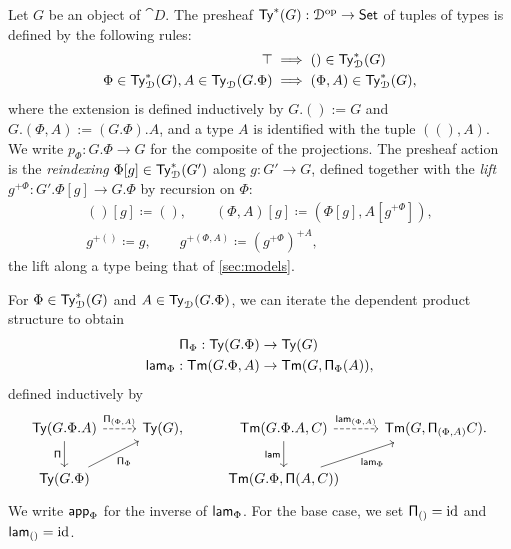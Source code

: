 \begin{definition}\label{def:type-telescopes}
    Let $G$ be an object of $\cat{D}$. The presheaf $\mathsf{Ty}^*(G) : \mathcal{D}^{\mathrm{op}}\to\mathsf{Set}$ of tuples of types is defined by the following rules:
    \begin{align*}
        \top &\implies () \in \mathsf{Ty}^*_{\mathcal{D}}(G)\\
        \Phi \in \mathsf{Ty}^*_{\mathcal{D}}(G), A \in \mathsf{Ty}_{\mathcal{D}}(G.\Phi) &\implies (\Phi,A) \in \mathsf{Ty}^*_{\mathcal{D}}(G),
    \end{align*}
    where the extension is defined inductively by $G.() := G$ and $G.(\Phi,A) := (G.\Phi).A$, and a type $A$ is identified with the tuple $((),A)$. We write $p_\Phi : G.\Phi \to G$ for the composite of the projections. The presheaf action is the \emph{reindexing} $\Phi[g] \in \mathsf{Ty}^*_{\mathcal{D}}(G')$ along $g : G' \to G$, defined together with the \emph{lift} $g^{+\Phi} : G'.\Phi[g] \to G.\Phi$ by recursion on $\Phi$:
    \begin{gather*}
        ()[g] \coloneqq (), \qquad (\Phi, A)[g] \coloneqq (\Phi[g], A[g^{+\Phi}]),\\
        g^{+()} \coloneqq g, \qquad g^{+(\Phi, A)} \coloneqq (g^{+\Phi})^{+A},
    \end{gather*}
    the lift along a type being that of \cref{sec:models}.

    For $\Phi \in \mathsf{Ty}_{\mathcal{D}}^*(G)$ and $A \in \mathsf{Ty}_{\mathcal{D}}(G.\Phi)$, we can iterate the dependent product structure to obtain
    \begin{align*}
        \mathsf{\Pi}_\Phi : \mathsf{Ty}(G.\Phi) &\to \mathsf{Ty}(G)\\
        \mathsf{lam}_\Phi : \mathsf{Tm}(G.\Phi,A) &\to \mathsf{Tm}(G,\mathsf{\Pi}_\Phi(A)),
    \end{align*}
    defined inductively by 
    \[\begin{tikzcd}
    	{\Ty(G.\Phi.A)} & {\Ty(G),} & {\Tm(G.\Phi.A,C)} & {\Tm(G,\PiT_{(\Phi,A)}C).} \\
    	{\Ty(G.\Phi)} && {\Tm(G.\Phi,\PiT(A,C))}
    	\arrow["{\PiT_{(\Phi,A)}}", dashed, from=1-1, to=1-2]
    	\arrow["\PiT"', from=1-1, to=2-1]
    	\arrow["{\lam_{(\Phi,A)}}", dashed, from=1-3, to=1-4]
    	\arrow["\lam"', from=1-3, to=2-3]
    	\arrow["{\PiT_\Phi}"', from=2-1, to=1-2]
    	\arrow["{\lam_\Phi}"', from=2-3, to=1-4]
    \end{tikzcd}\]
    We write $\mathsf{app}_\Phi$ for the inverse of $\mathsf{lam}_\Phi$. For the base case, we set $\mathsf{\Pi}_{()} = \mathrm{id}$ and $\mathsf{lam}_{()} = \mathrm{id}$.
\end{definition}

